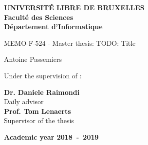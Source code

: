 \documentclass[11pt,a4paper,oneside]{book}
\begin{document}
\frontmatter
\begin{titlepage}
\begin{center}
\textbf{UNIVERSIT\'E LIBRE DE BRUXELLES}\\
\textbf{Facult\'{e} des Sciences}\\
\textbf{D\'{e}partement d'Informatique}
\vfill{}\vfill{}

{\LARGE  MEMO-F-524 - Master thesis:
 \vspace*{2cm}
 \linebreak[4] TODO: Title}

{\Huge \par}
\begin{center}{\Large Antoine Passemiers}\end{center}{\Huge \par}
\vfill{}\vfill{}
\large Under the supervision of : \\
\begin{flushleft}
\vspace{0.2cm}
\textbf{Dr. Daniele Raimondi} \\
\large Daily advisor \\
\vspace{0.5cm}
\textbf{Prof. Tom Lenaerts} \\
\large Supervisor of the thesis \\
{\large }\hfill{}{}
\end{flushleft}
{\large\par}\vfill{}\vfill{}\enlargethispage{3cm}
\textbf{Academic year 2018~-~2019}
\end{center}
\end{titlepage}


\thispagestyle{empty} 
\null

\makeatletter
\def\BState{\State\hskip-\ALG@thistlm}
\makeatother

\newenvironment{vcenterpage}
{\newpage\thispagestyle{empty} 
\vspace*{\fill}}
{\vspace*{\fill}\par\pagebreak}

\newcommand{\pdbid}[1] {(PDB: #1)}

\thispagestyle{empty} 
\setcounter{page}{0}
\tableofcontents
\mainmatter 














\appendix

\backmatter

\printindex %





\newpage
\printglossary[type=main]
\end{document}

